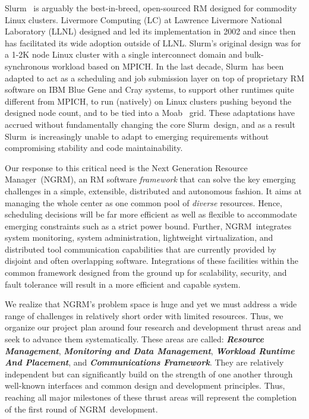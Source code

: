 \documentclass{article}
\newcommand{\ngrm}{NGRM}
\newcommand{\ngrmfull}{Next Generation Resource Manager}
\newcommand{\slurm}{Slurm}
\newcommand{\moab}{Moab}
\begin{document}
\slurm~\cite{SlurmDesign} is arguably the
best-in-breed, open-sourced RM designed for commodity Linux clusters.
Livermore Computing (LC) at Lawrence Livermore National Laboratory (LLNL)
designed and led its implementation in 2002 and since then has facilitated
its wide adoption outside of LLNL.
\slurm's original design was for a 1-2K node Linux cluster with a single
interconnect domain and bulk-synchronous workload based on MPICH.
In the last decade, \slurm\ has been adapted
to act as a scheduling and job submission layer on top of proprietary
RM software on IBM Blue Gene and Cray systems,
to support other runtimes quite different from MPICH,
to run (natively) on Linux clusters pushing beyond the designed node count,
and to be tied into a \moab~\cite{MOAB:online} grid.
These adaptations have accrued without fundamentally changing the
core \slurm\ design, and as a result \slurm\ is increasingly
unable to adapt to emerging requirements without compromising
stability and code maintainability.

Our response to this critical need is the \ngrmfull\ (\ngrm ), an RM software
{\em framework} that can solve the key emerging challenges 
in a simple, extensible, distributed and autonomous fashion.
It aims at managing the whole center as one common pool of {\em diverse} 
resources. Hence, scheduling decisions will be 
far more efficient as well as flexible to accommodate 
emerging constraints such as a strict power bound. 
Further, \ngrm\ integrates
system monitoring, system administration, lightweight
virtualization, and distributed tool communication capabilities
that are currently provided by disjoint and often overlapping software.
Integrations of these facilities within the common framework designed from
the ground up for scalability, security, and fault tolerance will result
in a more efficient and capable system.

We realize that \ngrm's problem space is huge and yet we must address a wide range 
of challenges in relatively short order with limited resources. Thus, we 
organize our project plan around four research and development thrust areas 
and seek to advance them systematically.
These areas are called:
{\bf{\em Resource Management}},
{\bf{\em Monitoring and Data Management}},
{\bf{\em Workload Runtime And Placement}}, and
{\bf{\em Communications Framework}}.
They are relatively independent but can significantly build on the
strength of one another through well-known interfaces and common design
and development principles.
Thus, reaching all major milestones of these thrust areas 
will represent the completion of the first round of \ngrm\ development. 
\end{document}
